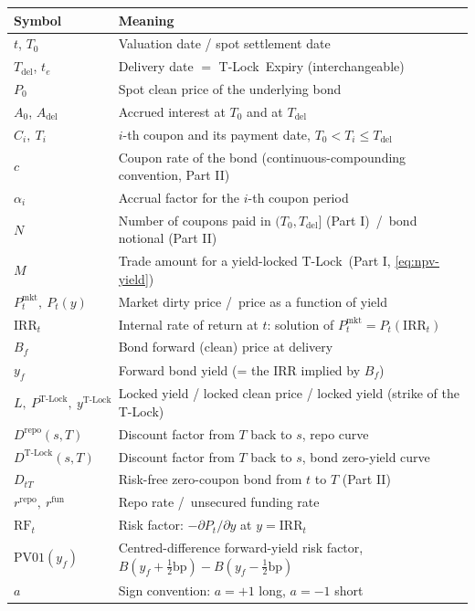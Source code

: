 \documentclass[11pt]{article}
\theoremstyle{definition}
\newcommand{\Tlock}{T-Lock}
\newcommand{\IRR}{\ensuremath{\mathrm{IRR}}}
\newcommand{\RF}{\ensuremath{\mathrm{RF}}}                 %
\newcommand{\PVone}{\ensuremath{\mathrm{PV01}}}
\newcommand{\Drepo}{D^{\mathrm{repo}}}
\newcommand{\Dtl}{D^{\text{T-Lock}}}
\newcommand{\Tdel}{T_{\mathrm{del}}}
\newcommand{\Adel}{A_{\mathrm{del}}}
\newcommand{\Ptl}{P^{\text{T-Lock}}}
\newcommand{\ytl}{y^{\text{T-Lock}}}
\newcommand{\Bf}{B_f}
\newcommand{\rrepo}{r^{\mathrm{repo}}}
\newcommand{\rfun}{r^{\mathrm{fun}}}
\begin{document}
\begin{center}
\renewcommand{\arraystretch}{1.12}
\begin{tabular}{l p{12cm}}
\toprule
\textbf{Symbol} & \textbf{Meaning} \\
\midrule
$t$, $T_0$ & Valuation date / spot settlement date \\
$\Tdel$, $t_e$ & Delivery date $=$ \Tlock\ Expiry (interchangeable) \\
$P_0$ & Spot clean price of the underlying bond \\
$A_0$, $\Adel$ & Accrued interest at $T_0$ and at $\Tdel$ \\
$C_i,\ T_i$ & $i$-th coupon and its payment date, $T_0 < T_i \le \Tdel$ \\
$c$ & Coupon rate of the bond (continuous-compounding convention, Part II) \\
$\alpha_i$ & Accrual factor for the $i$-th coupon period \\
$N$ & Number of coupons paid in $(T_0, \Tdel]$ (Part I)\ /\ bond notional (Part II) \\
$M$ & Trade amount for a yield-locked \Tlock\ (Part I, \cref{eq:npv-yield}) \\
$P^{\mathrm{mkt}}_t,\ P_t(y)$ & Market dirty price /\ price as a function of yield \\
$\IRR_t$ & Internal rate of return at $t$: solution of $P^{\mathrm{mkt}}_t = P_t(\IRR_t)$ \\
$\Bf$ & Bond forward (clean) price at delivery \\
$y_f$ & Forward bond yield (= the $\IRR$ implied by $\Bf$) \\
$L,\ \Ptl,\ \ytl$ & Locked yield / locked clean price / locked yield (strike of the \Tlock) \\
$\Drepo(s, T)$ & Discount factor from $T$ back to $s$, repo curve \\
$\Dtl(s, T)$ & Discount factor from $T$ back to $s$, bond zero-yield curve \\
$D_{tT}$ & Risk-free zero-coupon bond from $t$ to $T$ (Part II) \\
$\rrepo,\ \rfun$ & Repo rate /\ unsecured funding rate \\
$\RF_t$ & Risk factor: $-\partial P_t/\partial y$ at $y = \IRR_t$ \\
$\PVone(y_f)$ & Centred-difference forward-yield risk factor,
                $B(y_f + \tfrac12\text{bp}) - B(y_f - \tfrac12\text{bp})$ \\
$a$ & Sign convention: $a=+1$ long, $a=-1$ short \\
\bottomrule
\end{tabular}
\end{center}
\end{document}
